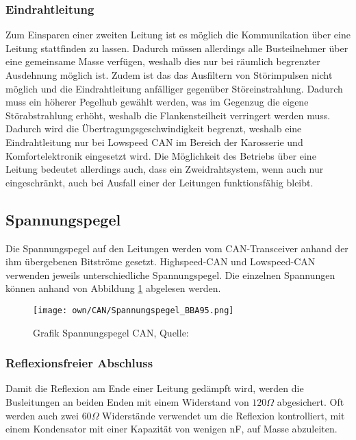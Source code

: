         
        \subsubsection{Eindrahtleitung}
        Zum Einsparen einer zweiten Leitung ist es möglich die Kommunikation über eine Leitung stattfinden zu lassen.
        Dadurch müssen allerdings alle Busteilnehmer über eine gemeinsame Masse verfügen, weshalb dies nur bei räumlich begrenzter Ausdehnung möglich ist.
        Zudem ist das das Ausfiltern von Störimpulsen nicht möglich und die Eindrahtleitung anfälliger gegenüber Störeinstrahlung.
        Dadurch muss ein höherer Pegelhub gewählt werden, was im Gegenzug die eigene Störabstrahlung erhöht, weshalb die Flankensteilheit verringert werden muss.
        Dadurch wird die Übertragungsgeschwindigkeit begrenzt, weshalb eine Eindrahtleitung nur bei Lowspeed CAN im Bereich der Karosserie und Komfortelektronik eingesetzt wird.
        Die Möglichkeit des Betriebs über eine Leitung bedeutet allerdings auch, dass ein Zweidrahtsystem, wenn auch nur eingeschränkt, auch bei Ausfall einer der Leitungen funktionsfähig bleibt. 

    \subsection{Spannungspegel}
    Die Spannungspegel auf den Leitungen werden vom CAN-Transceiver anhand der ihm übergebenen Bitströme gesetzt.
    Highspeed-CAN und Lowspeed-CAN verwenden jeweils unterschiedliche Spannungspegel.
    Die einzelnen Spannungen können anhand von Abbildung \ref{fig:Spannungspegel} abgelesen werden. 
    \begin{figure}[!htbp]
        \centering
        \texttt{[image: own/CAN/Spannungspegel\_BBA95.png]}
        \caption{Grafik Spannungspegel CAN, Quelle: \cite{BAA2011, S.94}}
        \label{fig:Spannungspegel}
    \end{figure}
    
        \subsubsection{Reflexionsfreier Abschluss}
        Damit die Reflexion am Ende einer Leitung gedämpft wird, werden die Busleitungen an beiden Enden mit einem Widerstand von $120 \Omega$ abgesichert.
        Oft werden auch zwei $60 \Omega$ Widerstände verwendet um die Reflexion kontrolliert, mit einem Kondensator mit einer Kapazität von wenigen nF, auf Masse abzuleiten.

